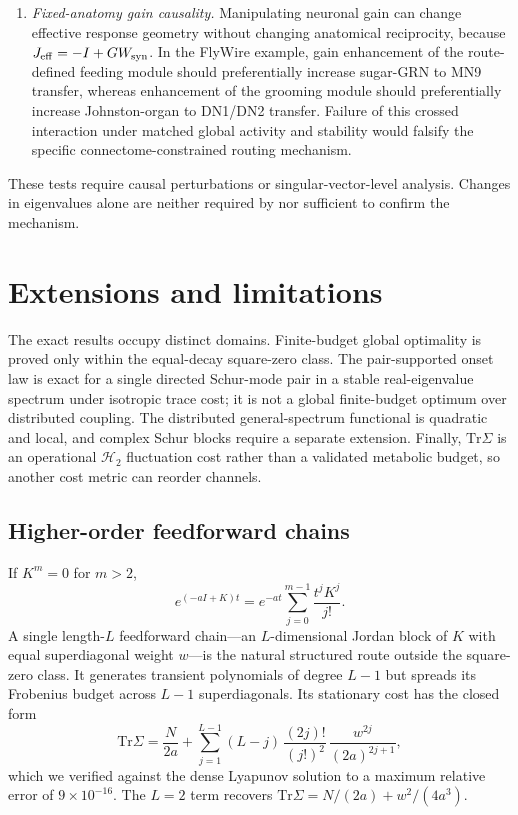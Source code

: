 \documentclass[
  aps,prl,preprint,notitlepage,superscriptaddress,nofootinbib,longbibliography,
  amsmath,amssymb
]{revtex4-2}
\newcommand{\Tr}{\mathrm{Tr}}
\begin{document}
\begin{enumerate}
\item \emph{Fixed-anatomy gain causality.}  Manipulating neuronal gain can
change effective response geometry without changing anatomical reciprocity,
because $J_{\rm eff}=-I+GW_{\rm syn}$.  In the FlyWire example, gain enhancement
of the route-defined feeding module should preferentially increase sugar-GRN to
MN9 transfer, whereas enhancement of the grooming module should preferentially
increase Johnston-organ to DN1/DN2 transfer.  Failure of this crossed
interaction under matched global activity and stability would falsify the
specific connectome-constrained routing mechanism.
\end{enumerate}

These tests require causal perturbations or singular-vector-level analysis.
Changes in eigenvalues alone are neither required by nor sufficient to confirm
the mechanism.

\section{Extensions and limitations}
\label{sec:s-extensions}

The exact results occupy distinct domains.  Finite-budget global optimality is
proved only within the equal-decay square-zero class.  The pair-supported onset
law is exact for a single directed Schur-mode pair in a stable real-eigenvalue
spectrum under isotropic trace cost; it is not a global finite-budget optimum
over distributed coupling.  The distributed general-spectrum functional is
quadratic and local, and complex Schur blocks require a separate extension.
Finally, $\Tr\Sigma$ is an operational $\mathcal H_2$ fluctuation cost rather
than a validated metabolic budget, so another cost metric can reorder channels.

\subsection{Higher-order feedforward chains}

If $K^m=0$ for $m>2$,
\begin{equation}
e^{(-aI+K)t}
=e^{-at}\sum_{j=0}^{m-1}\frac{t^jK^j}{j!}.
\end{equation}
A single length-$L$ feedforward chain---an $L$-dimensional Jordan block of $K$
with equal superdiagonal weight $w$---is the natural structured route outside
the square-zero class. It generates transient polynomials of degree $L-1$ but
spreads its Frobenius budget across $L-1$ superdiagonals. Its stationary cost
has the closed form
\begin{equation}
\Tr\Sigma=\frac{N}{2a}
+\sum_{j=1}^{L-1}(L-j)\,\frac{(2j)!}{(j!)^2}\,
\frac{w^{2j}}{(2a)^{2j+1}},
\label{eq:s-chaincost}
\end{equation}
which we verified against the dense Lyapunov solution to a maximum relative
error of $9\times10^{-16}$. The $L=2$ term recovers
$\Tr\Sigma=N/(2a)+w^2/(4a^3)$.
\end{document}
